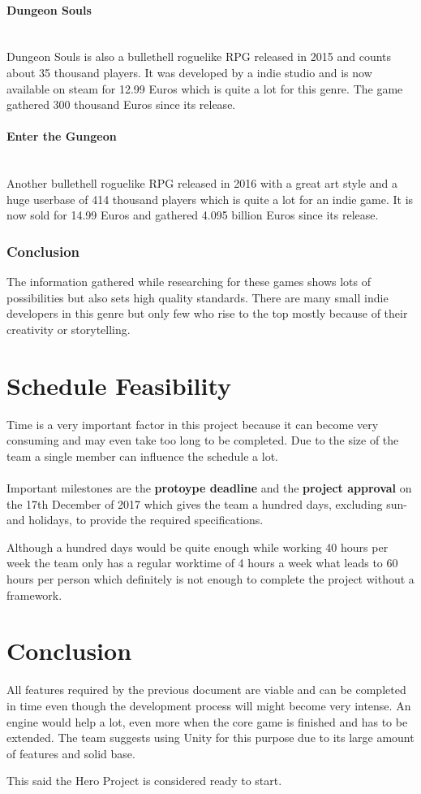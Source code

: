 \documentclass[11pt]{article}
\begin{document}
\paragraph{Dungeon Souls}~\\
Dungeon Souls is also a bullethell roguelike RPG released in 2015 and counts about 35 thousand players. It was developed by a indie studio and is now available on steam for 12.99 Euros which is quite a lot for this genre. 
The game gathered 300 thousand Euros since its release.

\paragraph{Enter the Gungeon}~\\
Another bullethell roguelike RPG released in 2016 with a great art style and a huge userbase of 414 thousand players which is quite a lot for an indie game. 
It is now sold for 14.99 Euros and gathered 4.095 billion Euros since its release.

\subsubsection{Conclusion}
The information gathered while researching for these games shows lots of possibilities but also sets high quality standards. 
There are many small indie developers in this genre but only few who rise to the top mostly because of their creativity or storytelling.

\section{Schedule Feasibility}
Time is a very important factor in this project because it can become very consuming and may even take too long to be completed.
Due to the size of the team a single member can influence the schedule a lot.
\\
\\
Important milestones are the \textbf{protoype deadline} and the \textbf{project approval} on the 17th December of 2017 which gives the team a hundred days, excluding sun- and holidays, to provide the required specifications.

Although a hundred days would be quite enough while working 40 hours per week the team only has a regular worktime of 4 hours a week what leads to 60 hours per person which definitely is not enough to complete the project without a framework.

\section{Conclusion}
All features required by the previous document are viable and can be completed in time even though the development process will might become very intense.
An engine would help a lot, even more when the core game is finished and has to be extended. The team suggests using Unity for this purpose due to its large amount of features and solid base.

This said the Hero Project is considered ready to start.
\end{document}
